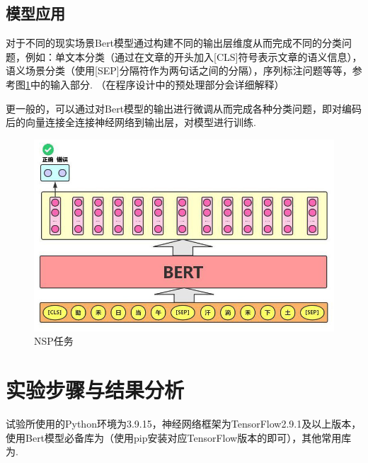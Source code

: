 \documentclass[12pt, a4paper, oneside]{ctexart}
\numberwithin{equation}{section}  %
\begin{document}
\vspace{2.5cm}
\subsection{模型应用}
对于不同的现实场景Bert模型通过构建不同的输出层维度从而完成不同的分类问题，例如：单文本分类（通过在文章的开头加入{[}CLS{]}符号表示文章的语义信息），语义场景分类（使用{[}SEP{]}分隔符作为两句话之间的分隔），序列标注问题等等，参考图\ref{fig-NSP}中的输入部分. （在程序设计中的预处理部分会详细解释）

更一般的，可以通过对Bert模型的输出进行微调从而完成各种分类问题，即对编码后的向量连接全连接神经网络到输出层，对模型进行训练.

\begin{figure}[htbp]
\centering
\includegraphics[scale=0.4]{../NLP大作业note.figure/Next Sentence Prediction part1.png}
\caption{NSP任务}
\label{fig-NSP}
\end{figure}

\vspace{-0.3cm}
\section{实验步骤与结果分析}
试验所使用的Python环境为3.9.15，神经网络框架为TensorFlow2.9.1及以上版本，使用Bert模型必备库为（使用pip安装对应TensorFlow版本的即可），其他常用库为.
\end{document}
